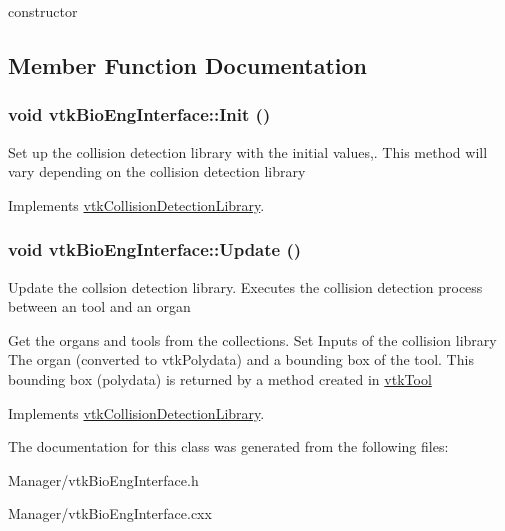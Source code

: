 constructor 

\subsection{Member Function Documentation}
\hypertarget{classvtkBioEngInterface_a52f71a20ab8e16bbeb357642975a5b67}{
\subsubsection[{Init}]{\setlength{\rightskip}{0pt plus 5cm}void vtkBioEngInterface::Init ()}}
\label{classvtkBioEngInterface_a52f71a20ab8e16bbeb357642975a5b67}


Set up the collision detection library with the initial values,. This method will vary depending on the collision detection library 

Implements \hyperlink{classvtkCollisionDetectionLibrary_ac29256d189958f001608f8f5d170a73c}{vtkCollisionDetectionLibrary}.\hypertarget{classvtkBioEngInterface_af04a067b7a6f524faa7ff14552147260}{
\subsubsection[{Update}]{\setlength{\rightskip}{0pt plus 5cm}void vtkBioEngInterface::Update ()}}
\label{classvtkBioEngInterface_af04a067b7a6f524faa7ff14552147260}


Update the collsion detection library. Executes the collision detection process between an tool and an organ 

Get the organs and tools from the collections. Set Inputs of the collision library The organ (converted to vtkPolydata) and a bounding box of the tool. This bounding box (polydata) is returned by a method created in \hyperlink{classvtkTool}{vtkTool} 

Implements \hyperlink{classvtkCollisionDetectionLibrary_ae3ce4d5055eee783a8bf9f06f62f5667}{vtkCollisionDetectionLibrary}.

The documentation for this class was generated from the following files:\begin{DoxyCompactItemize}
\item 
Manager/vtkBioEngInterface.h\item 
Manager/vtkBioEngInterface.cxx\end{DoxyCompactItemize}
